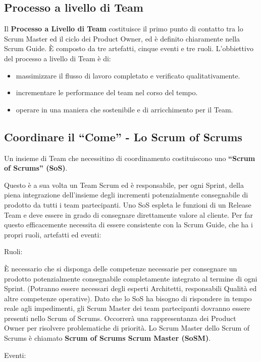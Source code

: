 \documentclass[12pt,a4paper,parskip=full]{scrartcl}
\begin{document}
\subsection{Processo a livello di Team}
Il \textbf{Processo a Livello di Team} costituisce il primo punto di contatto tra lo Scrum Master ed il ciclo dei Product Owner, ed è definito chiaramente nella Scrum Guide. È composto da tre artefatti, cinque eventi e tre ruoli. L'obbiettivo del processo a livello di Team è di:
\begin{itemize}
\item massimizzare il flusso di lavoro completato e verificato qualitativamente.
\item incrementare le performance del team nel corso del tempo.
\item operare in una maniera che sostenibile e di arricchimento per il Team.
\end{itemize}

\subsection{Coordinare il ``Come'' - Lo Scrum of Scrums}
Un insieme di Team che necessitino di coordinamento costituiscono uno \textbf{``Scrum of Scrums'' (SoS)}.

Questo è a sua volta un Team Scrum ed  è responsabile, per ogni Sprint, della piena integrazione dell'insieme degli incrementi potenzialmente consegnabile di prodotto da tutti i team partecipanti. Uno SoS espleta le funzioni di un Release Team e deve essere in grado di consegnare direttamente valore al cliente. Per far questo efficacemente necessita di essere consistente con la Scrum Guide, che ha i propri ruoli, artefatti ed eventi:

Ruoli:

È necessario che si disponga delle competenze necessarie per consegnare un prodotto potenzialmente consegnabile completamente integrato al termine di ogni Sprint. (Potranno essere necessari degli esperti Architetti, responsabili Qualità ed altre competenze operative). Dato che lo SoS ha bisogno di rispondere in tempo reale agli impedimenti, gli Scrum Master dei team partecipanti dovranno essere presenti nello Scrum of Scrums. Occorrerà una rappresentanza dei Product Owner per risolvere problematiche di priorità. Lo Scrum Master dello Scrum of Scrums è chiamato \textbf{Scrum of Scrums Scrum Master (SoSM)}.

Eventi:
\end{document}
